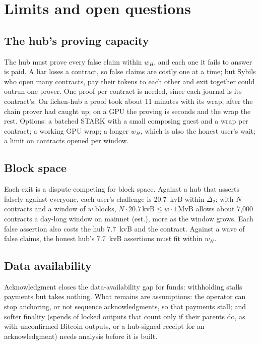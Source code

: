 \documentclass[11pt]{article}
\begin{document}
\section{Limits and open questions}
\label{sec:open}

\subsection{The hub's proving capacity}
\label{sec:capacity}

The hub must prove every false claim within $w_H$, and each one it fails
to answer is paid. A liar loses a contract, so false claims are costly
one at a time; but Sybils who open many contracts, pay their tokens to
each other and exit together could outrun one prover. One proof per
contract is needed, since each journal is its contract's. On lichen-hub
a proof took about 11 minutes with its wrap, after the chain prover had
caught up; on a GPU the proving is seconds and the wrap the rest.
Options: a batched STARK with a small composing guest and a wrap per
contract; a working GPU wrap; a longer $w_H$, which is also the honest
user's wait; a limit on contracts opened per window.

\subsection{Block space}

Each exit is a dispute competing for block space. Against a hub that
asserts falsely against everyone, each user's challenge is 20.7~kvB
within $\Delta_2$; with $N$ contracts and a window of $w$ blocks,
$N \cdot 20.7\,\mathrm{kvB} \le w \cdot 1\,\mathrm{MvB}$ allows about
7,000 contracts a day-long window on mainnet (est.), more as the window
grows. Each false assertion also costs the hub 7.7~kvB and the
contract. Against a wave of false claims, the honest hub's 7.7~kvB
assertions must fit within $w_H$.

\subsection{Data availability}

Acknowledgment closes the data-availability gap for funds: withholding
stalls payments but takes nothing. What remains are assumptions: the
operator can stop anchoring, or not sequence acknowledgments, so that
payments stall; and softer finality (spends of locked outputs that count
only if their parents do, as with unconfirmed Bitcoin outputs, or a
hub-signed receipt for an acknowledgment) needs analysis before it is
built.
\end{document}
